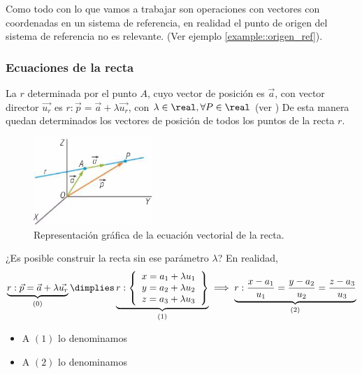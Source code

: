 Como todo con lo que vamos a trabajar son operaciones con vectores con coordenadas en un sistema de referencia, en realidad el punto de origen del sistema de referencia no es relevante. (Ver ejemplo \ref{example::origen_ref}).

\subsubsection{Ecuaciones de la recta}

La 
%
 $r$ determinada por el punto $A$, cuyo vector de posición es $\vec{a}$, con vector director $\vec{u_r} $  es $r : \vec{p} = \vec{a} + \lambda \vec{u_r}$, con $\lambda\in\real, \forall P\in\real$ (ver )
%
De esta manera quedan determinados los vectores de posición de todos los puntos de la recta $r$.


\begin{figure}[hptb]
    \centering
    \includegraphics[width=0.4\textwidth]{img/EcVectorialRecta.png}
    \caption{Representación gráfica de la ecuación vectorial de la recta.}
    \label{fig::recta_ecuacion_vectorial}
\end{figure}


¿Es posible construir la recta sin ese parámetro $\lambda$? En realidad,
$$\underbrace{r : \vec{p} = \vec{a} + \lambda \vec{u_r}}_{(0)}\dimplies \underbrace{r:\displaystyle \left\{
\begin{array}{c} 
  x = a_1 + \lambda u_1\\
  y = a_2 + \lambda u_2 \\ 
  z = a_3 + \lambda u_3
\end{array}\right\}}_{(1)} \implies \underbrace{r:\frac{x-a_1}{u_1} = \frac{y-a_2}{u_2} = \frac{z-a_3}{u_3}}_{(2)}$$

\begin{itemize}
    \item A $(1)$ lo denominamos 
    \item A $(2)$ lo denominamos 
\end{itemize}

